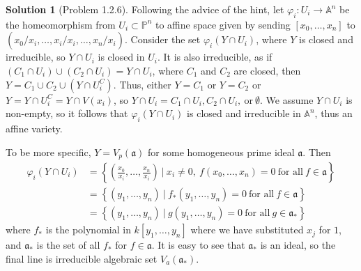 \documentclass[aps,pra,showpacs,notitlepage,onecolumn,superscriptaddress,nofootinbib]{revtex4-1}
\theoremstyle{definition}
\newtheorem{solution}{Solution}[section]
\begin{document}
\begin{solution}[Problem 1.2.6]
  Following the advice of the hint, let $\varphi_i : U_i \rightarrow \mathbb{A}^n$ be the homeomorphism from $U_i \subset \mathbb{P}^n$ to affine space given by sending $[x_0, \dots, x_n]$ to $(x_0/x_i, \dots, \widehat{x_i/x_i}, \dots, x_n/x_i)$.
  Consider the set $\varphi_i(Y \cap U_i)$, where $Y$ is closed and irreducible, so $Y \cap U_i$ is closed in $U_i$. It is also irreducible, as if $(C_1 \cap U_i) \cup (C_2 \cap U_i) = Y \cap U_i$, where $C_1$ and $C_2$ are closed, then $Y = C_1 \cup C_2 \cup (Y \cap U_i^{C})$.
  Thus, either $Y = C_1$ or $Y = C_2$ or $Y = Y \cap U_i^{C} = Y \cap V(x_i)$, so $Y \cap U_i = C_1 \cap U_i, C_2 \cap U_i, \ \text{or} \ \emptyset$. We assume $Y \cap U_i$ is non-empty, so
  it follows that $\varphi_i(Y \cap U_i)$ is closed and irreducible in $\mathbb{A}^n$, thus an affine variety.

  To be more specific, $Y = V_p(\mathfrak{a})$ for some homogeneous prime ideal $\mathfrak{a}$. Then
  \begin{align}
    \varphi_i(Y \cap U_i) &= \left\{ \left( \frac{x_0}{x_i}, \dots, \frac{x_n}{x_i} \right) \ \Big| \ x_i \neq 0, \ f(x_0, \dots, x_n) = 0 \ \text{for all} \ f \in \mathfrak{a} \right\}
    \\ &= \left\{ (y_1, \dots, y_n) \ | \ f_{*}(y_1, \dots, y_n) = 0 \ \text{for all} \ f \in \mathfrak{a} \right\}
    \\ &= \left\{ (y_1, \dots, y_n) \ | \ g(y_1, \dots, y_n) = 0 \ \text{for all} \ g \in \mathfrak{a}_{*} \right\}
    \end{align}
  where $f_{*}$ is the polynomial in $k[y_1, \dots, y_n]$ where we have substituted $x_j$ for $1$, and $\mathfrak{a}_{*}$ is the set of all $f_{*}$ for $f \in \mathfrak{a}$.
  It is easy to see that $\mathfrak{a}_{*}$ is an ideal, so the final line is irreducible algebraic set $V_a(\mathfrak{a}_{*})$.


\end{solution}
\end{document}
